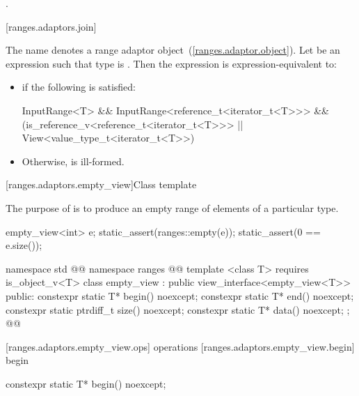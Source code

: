 \begin{itemdescr}
\pnum
\returns {}.
\end{itemdescr}

[ranges.adaptors.join]{}

\pnum
The name  denotes a range adaptor
object~(\ref{ranges.adaptor.object}). Let  be an expression such
that type  is . Then the expression
 is expression-equivalent to:

\begin{itemize}
\item {} if the following is satisfied:
\begin{codeblock}
InputRange<T> &&
InputRange<reference_t<iterator_t<T>>> &&
(is_reference_v<reference_t<iterator_t<T>>> ||
 View<value_type_t<iterator_t<T>>)
\end{codeblock}
\item Otherwise,  is ill-formed.
\end{itemize}

[ranges.adaptors.empty_view]{Class template }

\pnum
The purpose of  is to produce an empty range of elements of
a particular type.

\pnum
\enterexample
\begin{codeblock}
empty_view<int> e;
static_assert(ranges::empty(e));
static_assert(0 == e.size());
\end{codeblock}
\exitexample

\begin{codeblock}
namespace std { @@ namespace ranges { @@
  template <class T>
    requires is_object_v<T>
  class empty_view : public view_interface<empty_view<T>> {
  public:
    constexpr static T* begin() noexcept;
    constexpr static T* end() noexcept;
    constexpr static ptrdiff_t size() noexcept;
    constexpr static T* data() noexcept;
  };
}}@\removed{\}\}}@
\end{codeblock}

[ranges.adaptors.empty_view.ops]{ operations}
[ranges.adaptors.empty_view.begin]{ begin}

%
\begin{itemdecl}
constexpr static T* begin() noexcept;
\end{itemdecl}

